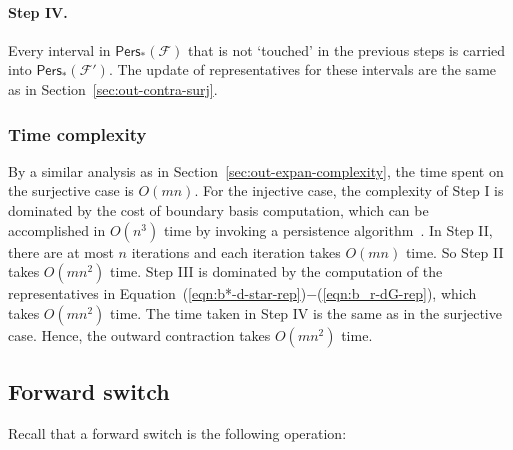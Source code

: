 \documentclass[letterpaper,11pt]{article}
\theoremstyle{mythmstyle}
\theoremstyle{mydefstyle}
\theoremstyle{plain}
\theoremstyle{definition}
\newcommand{\Pers}{\mathsf{Pers}}
\newcommand{\<}[1]{\langle #1\rangle}
\newcommand{\lbarrowspace}{\;}
\newcommand{\inctosp}[1]{\xhookrightarrow{\lbarrowspace#1\lbarrowspace}}
\newcommand{\Fcal}{\mathcal{F}}
\newcommand{\sG}{\sigma}
\newcommand{\tG}{\tau}
\newcommand{\filtcnt}{m}
\newcommand{\simpcnt}{n}
\begin{document}
\paragraph{Step IV.}
Every interval in $\Pers_*(\Fcal)$
that is not `touched' in the previous steps
is carried into $\Pers_*(\Fcal')$.
The update of representatives for these intervals
are the same as in Section~\ref{sec:out-contra-surj}.


\subsubsection{Time complexity}
\label{sec:out-contra-complexity}
By a similar analysis as in Section~\ref{sec:out-expan-complexity},
the time spent on the surjective case is $O(\filtcnt\simpcnt)$.
For the injective case, the complexity of Step I
is dominated by the cost of boundary basis computation, 
which can be accomplished in $O(\simpcnt^3)$ time 
by invoking a persistence algorithm~\cite{cohen2006vines}.
In Step II,
there are at most $\simpcnt$ iterations and each iteration
takes $O(\filtcnt\simpcnt)$ time.
So Step II takes $O(\filtcnt\simpcnt^2)$ time.
Step III is dominated by the computation of the representatives in
Equation~(\ref{eqn:b*-d-star-rep})$-$(\ref{eqn:b_r-dG-rep}),
which takes $O(\filtcnt\simpcnt^2)$ time.
The time taken in Step IV is the same as in the surjective case.
Hence, the outward contraction takes $O(\filtcnt\simpcnt^2)$ time.

\subsection{Forward switch}
\label{sec:fwd-switch}

Recall that a forward switch is the following operation:

\vspace{-1em}
\begin{center}
\end{center}
\end{document}

